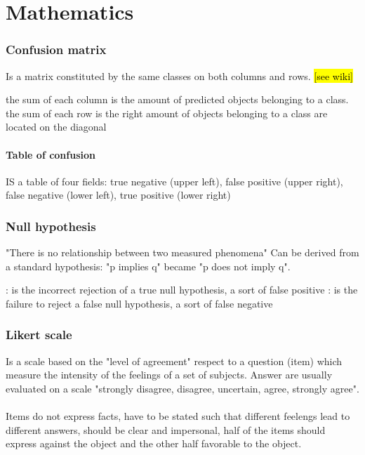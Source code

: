 \chapter{Mathematics}
	\subsection{Confusion matrix}
	Is a matrix constituted by the same classes on both columns and rows. \hl{[see wiki]}
	\begin{itemize}
		 the sum of each column is the amount of predicted objects belonging to a class.
		 the sum of each row is the right amount of objects belonging to a class
		 are located on the diagonal
	\end{itemize}
	\subsubsection{Table of confusion}
	IS a table of four fields: true negative (upper left), false positive (upper right), false negative (lower left), true positive (lower right)
	
	\subsection{Null hypothesis}
	"There is no relationship between two measured phenomena" Can be derived from a standard hypothesis: "p implies q" became "p does not imply q".
	\begin{itemize}
		: is the incorrect rejection of a true null hypothesis, a sort of false positive 
		: is the failure to reject a false null hypothesis, a sort of false negative
	\end{itemize}
	
	\subsection{Likert scale}
	Is a scale based on the "level of agreement" respect to a question (item) which measure the intensity of the feelings of a set of subjects. Answer are usually evaluated on a scale "strongly disagree, disagree, uncertain, agree, strongly agree".\\\\
	Items do not express facts, have to be stated such that different feelengs lead to different answers, should be clear and impersonal, half of the items should express against the object and the other half favorable to the object.
	
